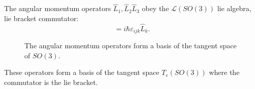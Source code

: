 The angular momentum operators $\hat L_1, \hat L_2 \hat L_3$ obey the $\mathscr{L}(SO(3))$ lie algebra, lie bracket commutator:
\begin{equation}
  [\hat L_i, \hat L_j] = i \hbar \varepsilon_{ijk} \hat L_k.
\end{equation}

\begin{figure}[htpb]
  \centering
  \def\svgwidth{0.3\columnwidth}
  
  \caption{The angular momentum operators form a basis of the tangent space of $SO(3)$.}
  \label{fig:so3}
\end{figure}

These operators form a basis of the tangent space $T_e (SO(3))$ where the commutator is the lie bracket.


